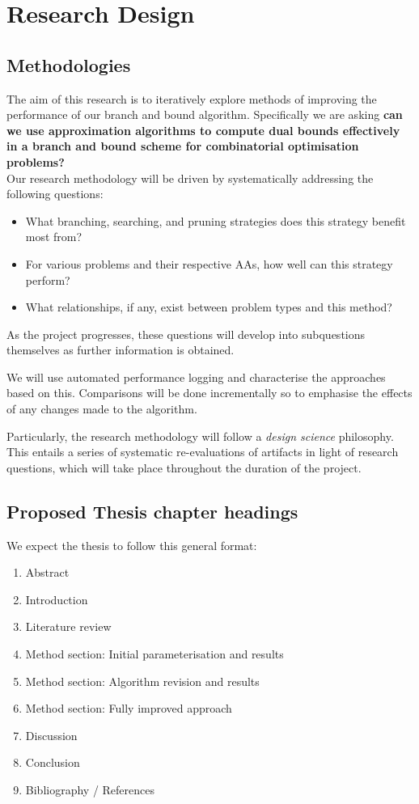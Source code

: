 \documentclass[12pt, a4paper]{article}
\begin{document}
\section{Research Design}

\subsection{Methodologies}

The aim of this research is to iteratively explore methods of improving the performance of our branch and bound algorithm. Specifically we are asking \textbf{can we use approximation algorithms to compute dual bounds effectively in a branch and bound scheme for combinatorial optimisation problems?}\\

Our research methodology will be driven by systematically addressing the following questions:

\begin{itemize}
\item What branching, searching, and pruning strategies does this strategy benefit most from?
\item For various problems and their respective AAs, how well can this strategy perform?
\item What relationships, if any, exist between problem types and this method?
\end{itemize}

As the project progresses, these questions will develop into subquestions themselves as further information is obtained.

We will use automated performance logging and characterise the approaches based on this. Comparisons will be done incrementally so to emphasise the effects of any changes made to the algorithm.

Particularly, the research methodology will follow a \textit{design science} philosophy. This entails a series of systematic re-evaluations of artifacts in light of research questions, which will take place throughout the duration of the project. 

\subsection{Proposed Thesis chapter headings}
We expect the thesis to follow this general format:
\begin{enumerate}
  \item Abstract
  \item Introduction
  \item Literature review
  \item Method section: Initial parameterisation and results
  \item Method section: Algorithm revision and results 
  \item Method section: Fully improved approach
  \item Discussion
  \item Conclusion
  \item Bibliography / References
\end{enumerate}
\newpage
\end{document}
